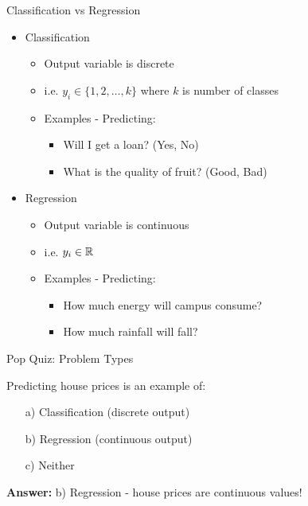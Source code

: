 \documentclass[dvipsnames]{beamer}
\begin{document}
\begin{frame}{Classification vs Regression}
\begin{itemize}
	\item Classification
	\begin{itemize}
		\item \pause Output variable is discrete
		\item \pause i.e.  $y_i \in \{1, 2, \ldots, k\}$ where $k$ is number of classes 
		\item \pause Examples - Predicting: 
		\begin{itemize}
			\item \pause Will I get a loan? (Yes, No)
			\item \pause What is the quality of fruit? (Good, Bad)
		\end{itemize}
	\end{itemize}
	\item \pause Regression
	\begin{itemize}
		\item \pause Output variable is continuous
		\item \pause i.e.  $y_i \in \mathbb{R}$ 
		\item \pause Examples - Predicting: 
		\begin{itemize}
			\item \pause How much energy will campus consume? 
			\item \pause How much rainfall will fall?
		\end{itemize}
	\end{itemize}
\end{itemize}

\end{frame}

\begin{frame}{Pop Quiz: Problem Types}
\begin{popquizbox}{3}
Predicting house prices is an example of:
\begin{enumerate}
\item[a)] Classification (discrete output)
\item[b)] Regression (continuous output)
\item[c)] Neither
\end{enumerate}

\vspace{0.5em}
\textbf{Answer:} b) Regression - house prices are continuous values!
\end{popquizbox}
\end{frame}
\end{document}
